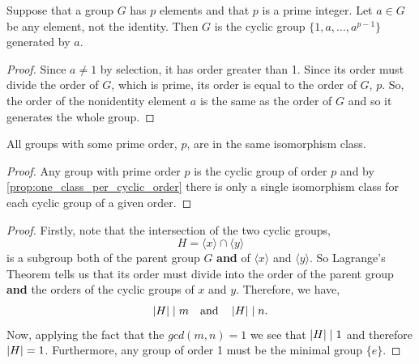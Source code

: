 \documentclass[MathsNotesBase.tex]{subfiles}
\begin{document}
{	\medskip
	\begin{corollary}
		\label{coro:prime_order_groups_are_cyclic}
		Suppose that a group $G$ has $p$ elements and that $p$ is a prime integer. Let $a \in G$ be any element, not the identity. Then $G$ is the cyclic group $\{1, a, \dots , a^{p-1}\}$ generated by $a$.
	\end{corollary}
	\begin{proof}
		Since $a \neq 1$ by selection, it has order greater than 1. Since its order must divide the order of $G$, which is prime, its order is equal to the order of $G$, $p$. So, the order of the nonidentity element $a$ is the same as the order of $G$ and so it generates the whole group.
	\end{proof}

	\medskip
	\begin{corollary}
		All groups with some prime order, $p$, are in the same isomorphism class.
	\end{corollary}
	\begin{proof}
		Any group with prime order $p$ is the cyclic group of order $p$ and by \autoref{prop:one_class_per_cyclic_order} there is only a single isomorphism class for each cyclic group of a given order.
	\end{proof}

	\bigskip
	\begin{proof}	
		Firstly, note that the intersection of the two cyclic groups,
		\[ H = \langle x \rangle \cap \langle y \rangle \]
		is a subgroup both of the parent group $G$ \textbf{and} of ${ \langle x \rangle }$ and ${ \langle y \rangle }$. So Lagrange's Theorem tells us that its order must divide into the order of the parent group \textbf{and} the orders of the cyclic groups of $x$ and $y$. Therefore, we have,
		\[ \left\lvert H\right\rvert \mid m \hspace{10pt}\text{and}\hspace{10pt} \left\lvert H\right\rvert \mid n. \]
		Now, applying the fact that the ${ gcd(m,n) = 1 }$ we see that ${ \left\lvert H\right\rvert \mid 1 }$ and therefore ${ \left\lvert H\right\rvert = 1 }$. Furthermore, any group of order 1 must be the minimal group ${ \{e\} }$.		
	\end{proof}

}
\end{document}
